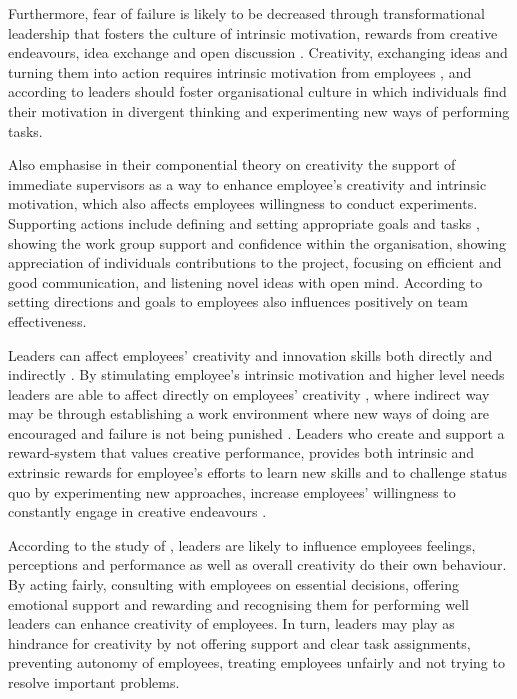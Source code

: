 Furthermore, fear of failure is likely to be decreased through transformational leadership that fosters the culture of intrinsic motivation, rewards from creative endeavours, idea exchange and open discussion \citet{amabile1998kill}. Creativity, exchanging ideas and turning them into action requires intrinsic motivation from employees \citep{jung2001transformational}, and according to \citet{amabile1998kill} leaders should foster organisational culture in which individuals find their motivation in divergent thinking and experimenting new ways of performing tasks. 

Also \citet{amabile2004leader} emphasise in their componential theory on creativity the support of immediate supervisors as a way to enhance employee's creativity and intrinsic motivation, which also affects employees willingness to conduct experiments. Supporting actions include defining and setting appropriate goals and tasks \citet{amabile1998kill}, showing the work group support and confidence within the organisation, showing appreciation of individuals contributions to the project, focusing on efficient and good communication, and listening novel ideas with open mind. \citep{amabile2004leader} According to \citet{hackman1987design} setting directions and goals to employees also influences positively on team effectiveness.

Leaders can affect employees' creativity and innovation skills both directly and indirectly \citep{jung2003role}. By stimulating employee's intrinsic motivation and higher level needs leaders are able to affect directly on employees' creativity \citep{tierney1999examination}, where indirect way may be through establishing a work environment where new ways of doing are encouraged and failure is not being punished \citep{amabile1996assessing}. Leaders who create and support a reward-system that values creative performance, provides both intrinsic and extrinsic rewards for employee's efforts to learn new skills and to challenge status quo by experimenting new approaches, increase employees' willingness to constantly engage in creative endeavours \citep{jung2001transformational,mumford1988creativity}.

According to the study of \citet{amabile2004leader}, leaders are likely to influence employees feelings, perceptions and performance as well as overall creativity do their own behaviour. By acting fairly, consulting with employees on essential decisions, offering emotional support and rewarding and recognising them for performing well leaders can enhance creativity of employees. In turn, leaders may play as hindrance for creativity by not offering support and clear task assignments, preventing autonomy of employees, treating employees unfairly and not trying to resolve important problems. 

